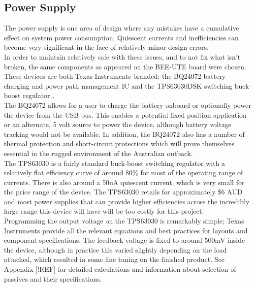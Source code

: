 \documentclass[12pt,openany,a4paper]{book}
\begin{document}
		\subsection{Power Supply}
		The power supply is one area of design where any mistakes have a cumulative effect on system power consumption. Quiescent currents and inefficiencies can become very significant in the face of relatively minor design errors. \\
		
		In order to maintain relatively safe with these issues, and to not fix what isn't broken, the same components as appeared on the BEE-UTE board were chosen. These devices are both Texas Instruments branded: the BQ24072 battery charging and power path management IC \cite{TIUSB} and the TPS63030DSK switching buck-boost regulator \cite{TIBUCK}. \\
		
		The BQ24072 allows for a user to charge the battery onboard or optionally power the device from the USB bus. This enables a potential fixed position application or an alternate, 5 volt source to power the device, although battery voltage tracking would not be available. In addition, the BQ24072 also has a number of thermal protection and short-circuit protections which will prove themselves essential in the rugged environment of the Australian outback. \\%
		
		The TPS63030 is a fairly standard buck-boost switching regulator with a relatively flat efficiency curve of around 80\% for most of the operating range of currents. There is also around a 50uA quiescent current, which is very small for the price range of the device. The TPS63030 retails for approximately \$6 AUD and most power supplies that can provide higher efficiencies across the incredibly large range this device will have will be too costly for this project. \\
		
		Programming the output voltage on the TPS63030 is remarkably simple; Texas Instruments provide all the relevant equations and best practices for layouts and component specifications. The feedback voltage is fixed to around 500mV inside the device, although in practice this varied slightly depending on the load attached, which resulted in some fine tuning on the finished product. See Appendix [!REF] for detailed calculations and information about selection of passives and their specifications.
		
\end{document}
